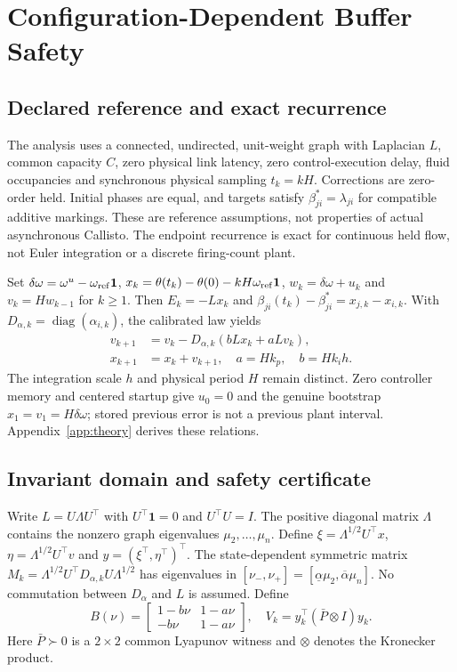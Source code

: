 \section{Configuration-Dependent Buffer Safety}
\label{sec:btd_reference}

\subsection{Declared reference and exact recurrence}
The analysis uses a connected, undirected, unit-weight graph with
Laplacian $L$, common capacity $C$, zero physical link latency, zero
control-execution delay, fluid
occupancies and synchronous physical sampling $t_k=kH$. Corrections
are zero-order held. Initial phases are equal, and targets satisfy
$\beta^*_{ji}=\lambda_{ji}$ for compatible additive markings. These
are reference assumptions, not properties of actual asynchronous
Callisto. The endpoint recurrence is exact for continuous held flow,
not Euler integration or a discrete firing-count plant.

Set $\delta\omega=\omega^u-\omega_{\rm ref}\mathbf1$,
$x_k=\theta(t_k)-\theta(0)-kH\omega_{\rm ref}\mathbf1$,
$w_k=\delta\omega+u_k$ and $v_k=Hw_{k-1}$ for $k\ge1$.
Then $E_k=-Lx_k$ and $\beta_{ji}(t_k)-\beta^*_{ji}=x_{j,k}-x_{i,k}$.
With $D_{\alpha,k}=\operatorname{diag}(\alpha_{i,k})$, the calibrated
law yields
\begin{align}
 v_{k+1}&=v_k-D_{\alpha,k}(bLx_k+aLv_k),\nonumber\\
 x_{k+1}&=x_k+v_{k+1},\quad a=Hk_p,\quad b=Hk_ih.
 \label{eq:btd_full_recurrence}
\end{align}
The integration scale $h$ and physical period $H$ remain distinct.
Zero controller memory and centered startup give $u_0=0$ and the
genuine bootstrap $x_1=v_1=H\delta\omega$; stored previous error is
not a previous plant interval. Appendix~\ref{app:theory} derives these relations.

\subsection{Invariant domain and safety certificate}
Write $L=U\Lambda U^\top$ with $U^\top\mathbf1=0$ and
$U^\top U=I$. The positive diagonal matrix $\Lambda$ contains
the nonzero graph eigenvalues $\mu_2,\ldots,\mu_n$.
Define $\xi=\Lambda^{1/2}U^\top x$, $\eta=\Lambda^{1/2}U^\top v$
and $y=(\xi^\top,\eta^\top)^\top$. The state-dependent symmetric
matrix $M_k=\Lambda^{1/2}U^\top D_{\alpha,k}U\Lambda^{1/2}$ has
eigenvalues in $[\nu_-,\nu_+]=[\underline\alpha\mu_2,
\overline\alpha\mu_n]$. No commutation between $D_\alpha$ and $L$
is assumed. Define
\begin{equation}
 B(\nu)=\begin{bmatrix}1-b\nu&1-a\nu\\-b\nu&1-a\nu\end{bmatrix},
 \quad V_k=y_k^\top(\bar P\otimes I)y_k.
\end{equation}
Here $\bar P\succ0$ is a $2\times2$ common Lyapunov witness and
$\otimes$ denotes the Kronecker product.

